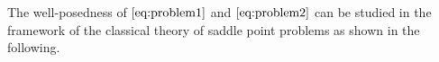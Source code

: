 \documentclass[r]{siamart171218}
\begin{document}
The well-posedness of $\eqref{eq:problem1}$ and $\eqref{eq:problem2}$ can be studied in the framework of the classical theory of saddle point problems as shown in the following.


\end{document}
